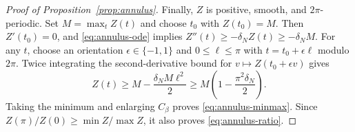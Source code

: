 \begin{proof}[Proof of Proposition~\ref{prop:annulus}]
Finally, $Z$ is positive, smooth, and $2\pi$-periodic.  Set
$M=\max_t Z(t)$ and choose $t_0$ with $Z(t_0)=M$.  Then
$Z'(t_0)=0$, and \eqref{eq:annulus-ode} implies
$Z''(t)\geq-\delta_N Z(t)\geq-\delta_N M$.
For any $t$, choose an orientation $\epsilon\in\{-1,1\}$ and
$0\leq\ell\leq\pi$ with $t=t_0+\epsilon\ell$ modulo $2\pi$.
Twice integrating the second-derivative bound for
$v\mapsto Z(t_0+\epsilon v)$ gives
\[
 Z(t)\geq M-\frac{\delta_N M\ell^2}{2}
 \geq M\left(1-\frac{\pi^2\delta_N}{2}\right).
\]
Taking the minimum and enlarging $C_\beta$ proves
\eqref{eq:annulus-minmax}.  Since
$Z(\pi)/Z(0)\geq\min Z/\max Z$, it also proves
\eqref{eq:annulus-ratio}.
\end{proof}
